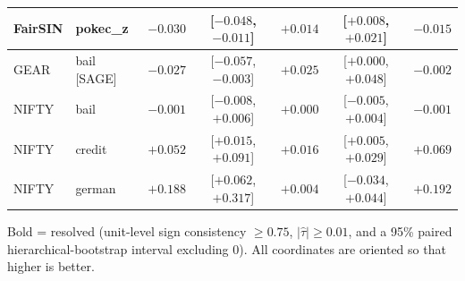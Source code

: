 \begin{table}[t]
\begin{tabular}{llrcrcr}
FairSIN & pokec\_z & $-0.030$ & [$-0.048$, $-0.011$] & $\mathbf{+0.014}$ & [$+0.008$, $+0.021$] & $-0.015$ \\
\midrule
GEAR & bail [SAGE] & $-0.027$ & [$-0.057$, $-0.003$] & $+0.025$ & [$+0.000$, $+0.048$] & $-0.002$ \\
\midrule
NIFTY & bail & $-0.001$ & [$-0.008$, $+0.006$] & $+0.000$ & [$-0.005$, $+0.004$] & $-0.001$ \\
NIFTY & credit & $+0.052$ & [$+0.015$, $+0.091$] & $\mathbf{+0.016}$ & [$+0.005$, $+0.029$] & $+0.069$ \\
NIFTY & german & $+0.188$ & [$+0.062$, $+0.317$] & $+0.004$ & [$-0.034$, $+0.044$] & $+0.192$ \\
\bottomrule
\end{tabular}
\par\smallskip\footnotesize Bold = resolved (unit-level sign consistency $\geq 0.75$, $|\hat\tau| \geq 0.01$, and a 95\% paired hierarchical-bootstrap interval excluding 0). All coordinates are oriented so that higher is better.
\end{table}
